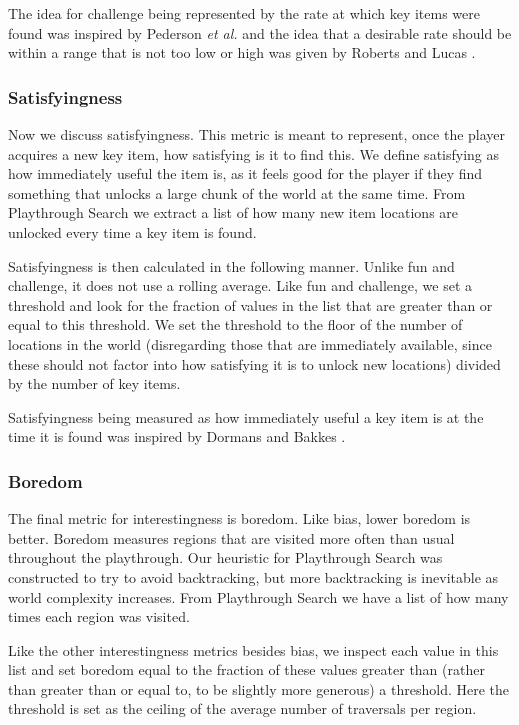 \documentclass{ieeeaccess}
\begin{document}
The idea for challenge being represented by the rate at which key items were found was inspired
by Pederson {\it et al.} \cite{b6} and the idea that a desirable rate should be within a range
that is not too low or high was given by Roberts and Lucas \cite{b8}.

\subsubsection{Satisfyingness}
Now we discuss satisfyingness. This metric is meant to represent, once the player acquires a
new key item, how satisfying is it to find this. We define satisfying as how immediately useful
the item is, as it feels good for the player if they find something that unlocks a large chunk
of the world at the same time. From Playthrough Search we extract a list of how many new item
locations are unlocked every time a key item is found.

Satisfyingness is then calculated in the following manner. Unlike fun and challenge, it does
not use a rolling average. Like fun and challenge, we set a threshold and look for the
fraction of values in the list that are greater than or equal to this threshold. We set the
threshold to the floor of the number of locations in the world (disregarding those that are
immediately available, since these should not factor into how satisfying it is to unlock new
locations) divided by the number of key items.

Satisfyingness being measured as how immediately useful a key item is at the time it is found
was inspired by Dormans and Bakkes \cite{b1}.

\subsubsection{Boredom}
The final metric for interestingness is boredom. Like bias, lower boredom is better. Boredom
measures regions that are visited more often than usual throughout the playthrough. Our
heuristic for Playthrough Search was constructed to try to avoid backtracking, but more
backtracking is inevitable as world complexity increases. From Playthrough Search we have a
list of how many times each region was visited.

Like the other interestingness metrics besides bias, we inspect each value in this list and set
boredom equal to the fraction of these values greater than (rather than greater than or equal
to, to be slightly more generous) a threshold. Here the threshold is set as the ceiling of the
average number of traversals per region.
\end{document}
